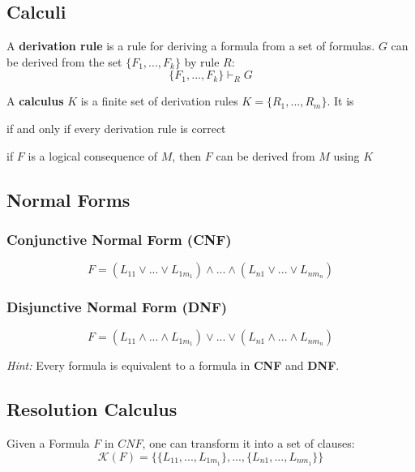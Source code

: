\documentclass[11pt]{article}
\begin{document}
\subsection{Calculi}

A \textbf{derivation rule} is a rule for deriving a formula from a set of formulas. $G$ can be derived from the set $\{F_1,...,F_k\}$ by rule $R$:
\begin{equation*}
	\{F_1,...,F_k\} \vdash_R G
\end{equation*}

A \textbf{calculus} $K$ is a finite set of derivation rules $K = \{R_1,...,R_m\}$. It is
\begin{description}[labelindent=16pt,style=multiline,leftmargin=4cm, noitemsep]
	\item[sound/correct] if and only if every derivation rule is correct
	\item[complete] if $F$ is a logical consequence of $M$, then $F$ can be derived from $M$ using $K$
\end{description}

\subsection{Normal Forms}

\subsubsection{Conjunctive Normal Form (CNF)}
\begin{equation*}
	F = (L_{11} \lor ... \lor L_{1m_1}) \land ... \land (L_{n1} \lor ... \lor L_{nm_n})
\end{equation*}

\subsubsection{Disjunctive Normal Form (DNF)}
\begin{equation*}
	F = (L_{11} \land ... \land L_{1m_1}) \lor ... \lor (L_{n1} \land ... \land L_{nm_n})
\end{equation*}

\emph{Hint:} Every formula is equivalent to a formula in \textbf{CNF} and \textbf{DNF}.

\subsection{Resolution Calculus}

Given a Formula $F$ in $CNF$, one can transform it into a set of clauses:
\begin{equation*}
	\mathcal{K}(F) = \{\{L_{11},...,L_{1m_1}\},...,\{L_{n1},...,L_{nm_1}\}\}
\end{equation*}
\end{document}
